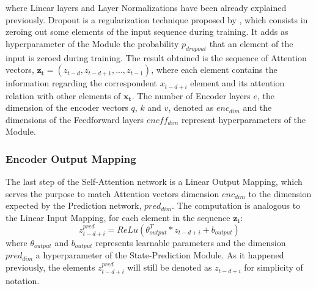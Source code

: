                 where Linear layers and Layer Normalizations have been already explained previously. Dropout is a regularization technique proposed by , which consists in zeroing out some elements of the input sequence during training. It adds as hyperparameter of the Module the probability $p_{dropout}$ that an element of the input is zeroed during training. \newline
                The result obtained is the sequence of Attention vectors, $\mathbf{z_t} = (z_{t-d}, z_{t-d+1}, ..., z_{t-1})$, where each element contains the information regarding the correspondent $x_{t-d+i}$ element and its attention relation with other elements of $\mathbf{x_t}$. The number of Encoder layers $e$, the dimension of the encoder vectors $q$, $k$ and $v$, denoted as $enc_{dim}$ and the dimensions of the Feedforward layers $encff_{dim}$ represent hyperparameters of the Module.
                
            \subsubsection{Encoder Output Mapping}
                The last step of the Self-Attention network is a Linear Output Mapping, which serves the purpose to match Attention vectors dimension $enc_{dim}$ to the dimension expected by the Prediction network, $pred_{dim}$. The computation is analogous to the Linear Input Mapping, for each element in the sequence $\mathbf{z_t}$:
                \[ z^{pred}_{t-d+i} = ReLu \left( \theta_{output}^{T} * z_{t-d+i} + b_{output} \right)\]
                where $\theta_{output}$ and $b_{output}$ represents learnable parameters and the dimension $pred_{dim}$ a hyperparameter of the State-Prediction Module. As it happened previously, the elements $z^{pred}_{t-d+i}$ will still be denoted as $z_{t-d+i}$ for simplicity of notation.
        
